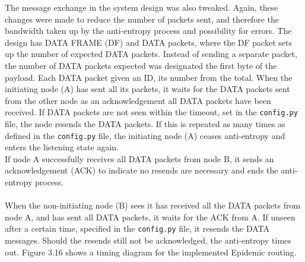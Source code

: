 \documentclass[12pt,a4paper]{report}
\begin{document}
The message exchange in the system design was also tweaked. Again, these changes were made to reduce the number of packets sent, and therefore the bandwidth taken up by the anti-entropy process and possibility for errors. The design has DATA FRAME (DF) and DATA packets, where the DF packet sets up the number of expected DATA packets. Instead of sending a separate packet, the number of DATA packets expected was designated the first byte of the payload. Each DATA packet given an ID, its number from the total. When the initiating node (A) has sent all its packets, it waits for the DATA packets sent from the other node as an acknowledgement all DATA packets have been received. If DATA packets are not seen within the timeout, set in the \verb'config.py' file, the node resends the DATA packets. If this is repeated as many times as defined in the \verb'config.py' file, the initiating node (A) ceases anti-entropy and enters the listening state again. \\ 
If node A successfully receives all DATA packets from node B, it sends an acknowledgement (ACK) to indicate no resends are necessary and ends the anti-entropy process. \\ \\
When the non-initiating node (B) sees it has received all the DATA packets from node A, and has sent all DATA packets, it waits for the ACK from A. If unseen after a certain time, specified in the \verb'config.py' file, it resends the DATA messages. Should the resends still not be acknowledged, the anti-entropy times out. Figure 3.16 shows a timing diagram for the implemented Epidemic routing. 
\end{document}
